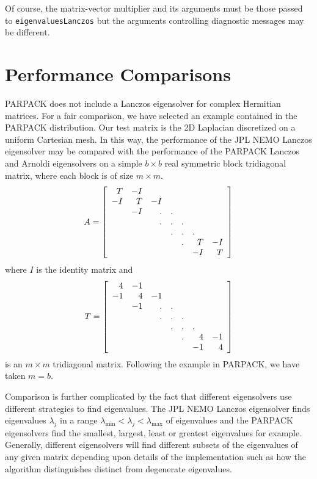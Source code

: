 \documentclass[twoside,12pt]{article}
\begin{document}
Of course, the matrix-vector multiplier and its arguments
must be those passed to {\tt eigenvaluesLanczos}
but the arguments controlling diagnostic messages may be different.

\section{Performance Comparisons}\label{sec:cmp}
PARPACK does not include a Lanczos eigensolver for complex Hermitian matrices.
For a fair comparison, we have selected an example contained 
in the PARPACK distribution\cite{ARPACK, www:arpack}.
Our test matrix is the 2D Laplacian discretized on a uniform Cartesian mesh.
In this way, the performance of the JPL NEMO Lanczos eigensolver 
may be compared with the performance of the PARPACK Lanczos and 
Arnoldi eigensolvers on a simple $b\!\times\!b$ real symmetric block 
tridiagonal matrix, where each block is of size $m\!\times\!m$.
\begin{equation}
A = \left[
\begin{array}{rrrrrrr}
 T &-I &   &   &   &   &   \\
-I & T &-I &   &   &   &   \\
   &-I & . & . &   &   &   \\
   &   & . & . & . &   &   \\
   &   &   & . & . &\multicolumn{1}{l}{.} &   \\
   &   &   &   & . & T &-I \\
   &   &   &   &   &-I & T
\end{array}
\right]
\end{equation}
where $I$ is the identity matrix and
\begin{equation}
T = \left[
\begin{array}{rrrrrrr}
 4 &-1 &   &   &   &   &   \\
-1 & 4 &-1 &   &   &   &   \\
   &-1 & . & . &   &   &   \\
   &   & . & . & . &   &   \\
   &   &   & . & . &\multicolumn{1}{l}{.} &   \\
   &   &   &   & . & 4 &-1 \\
   &   &   &   &   &-1 & 4
\end{array}
\right]
\end{equation}
is an $m\!\times\!m$ tridiagonal matrix.  Following the example in
PARPACK, we have taken $m=b$.

Comparison is further complicated by the fact that different eigensolvers
use different strategies to find eigenvalues.
The JPL NEMO Lanczos eigensolver finds eigenvalues $\lambda_{j}$
in a range $\lambda_{\mbox{min}} < \lambda_{j} < \lambda_{\mbox{max}}$
of eigenvalues and the PARPACK eigensolvers find the smallest, largest,
least or greatest eigenvalues for example.
Generally, different eigensolvers will find
different subsets of the eigenvalues of any given matrix
depending upon details of the implementation such as
how the algorithm distinguishes distinct from degenerate eigenvalues.
\end{document}

